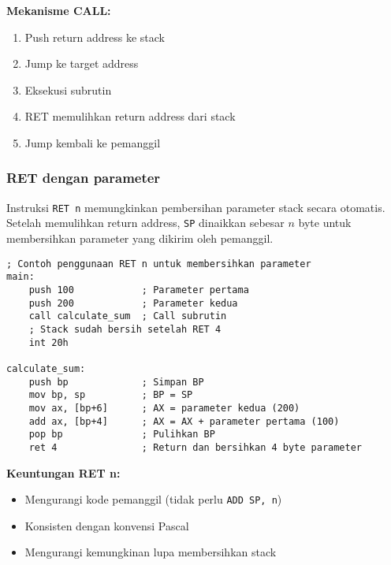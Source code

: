 \documentclass[../main.tex]{subfiles}
\begin{document}
                \textbf{Mekanisme CALL:}
                \begin{enumerate}
                    \item Push return address ke stack
                    \item Jump ke target address
                    \item Eksekusi subrutin
                    \item RET memulihkan return address dari stack
                    \item Jump kembali ke pemanggil
                \end{enumerate}

            \subsubsection{RET dengan parameter}
                Instruksi \texttt{RET n} memungkinkan pembersihan parameter stack secara otomatis. Setelah memulihkan return address, \texttt{SP} dinaikkan sebesar \(n\) byte untuk membersihkan parameter yang dikirim oleh pemanggil.

                \begin{lstlisting}[language={[x86masm]Assembler}, caption=Contoh RET dengan Parameter, label={lst:ret-with-param}]
; Contoh penggunaan RET n untuk membersihkan parameter
main:
    push 100            ; Parameter pertama
    push 200            ; Parameter kedua
    call calculate_sum  ; Call subrutin
    ; Stack sudah bersih setelah RET 4
    int 20h

calculate_sum:
    push bp             ; Simpan BP
    mov bp, sp          ; BP = SP
    mov ax, [bp+6]      ; AX = parameter kedua (200)
    add ax, [bp+4]      ; AX = AX + parameter pertama (100)
    pop bp              ; Pulihkan BP
    ret 4               ; Return dan bersihkan 4 byte parameter
                \end{lstlisting}

                \textbf{Keuntungan RET n:}
                \begin{itemize}
                    \item Mengurangi kode pemanggil (tidak perlu \texttt{ADD SP, n})
                    \item Konsisten dengan konvensi Pascal
                    \item Mengurangi kemungkinan lupa membersihkan stack
                \end{itemize}
\end{document}
